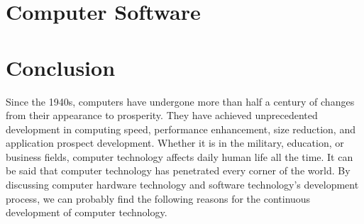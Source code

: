 \documentclass{article}
\begin{document}
\section{Computer Software}

\section{Conclusion}
Since the 1940s, computers have undergone more than half a century of changes from their appearance to prosperity. They have achieved unprecedented development in computing speed, performance enhancement, size reduction, and application prospect development. Whether it is in the military, education, or business fields, computer technology affects daily human life all the time. It can be said that computer technology has penetrated every corner of the world. By discussing computer hardware technology and software technology's development process, we can probably find the following reasons for the continuous development of computer technology.  
\end{document}
